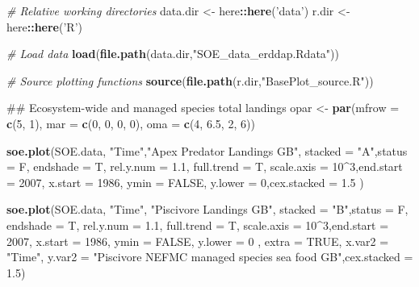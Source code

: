 \documentclass[]{article}
\newenvironment{Shaded}{\begin{snugshade}}{\end{snugshade}}
\newcommand{\KeywordTok}[1]{\textcolor[rgb]{0.13,0.29,0.53}{\textbf{#1}}}
\newcommand{\DataTypeTok}[1]{\textcolor[rgb]{0.13,0.29,0.53}{#1}}
\newcommand{\DecValTok}[1]{\textcolor[rgb]{0.00,0.00,0.81}{#1}}
\newcommand{\FloatTok}[1]{\textcolor[rgb]{0.00,0.00,0.81}{#1}}
\newcommand{\StringTok}[1]{\textcolor[rgb]{0.31,0.60,0.02}{#1}}
\newcommand{\CommentTok}[1]{\textcolor[rgb]{0.56,0.35,0.01}{\textit{#1}}}
\newcommand{\OtherTok}[1]{\textcolor[rgb]{0.56,0.35,0.01}{#1}}
\newcommand{\OperatorTok}[1]{\textcolor[rgb]{0.81,0.36,0.00}{\textbf{#1}}}
\newcommand{\NormalTok}[1]{#1}
\begin{document}
\begin{Shaded}
\begin{Highlighting}[]
\CommentTok{# Relative working directories}
\NormalTok{data.dir  <-}\StringTok{ }\NormalTok{here}\OperatorTok{::}\KeywordTok{here}\NormalTok{(}\StringTok{'data'}\NormalTok{)}
\NormalTok{r.dir <-}\StringTok{ }\NormalTok{here}\OperatorTok{::}\KeywordTok{here}\NormalTok{(}\StringTok{'R'}\NormalTok{)}

\CommentTok{# Load data}
\KeywordTok{load}\NormalTok{(}\KeywordTok{file.path}\NormalTok{(data.dir,}\StringTok{"SOE_data_erddap.Rdata"}\NormalTok{))}

\CommentTok{# Source plotting functions}
\KeywordTok{source}\NormalTok{(}\KeywordTok{file.path}\NormalTok{(r.dir,}\StringTok{"BasePlot_source.R"}\NormalTok{))}

\NormalTok{## Ecosystem-wide and managed species total landings}
\NormalTok{opar <-}\StringTok{ }\KeywordTok{par}\NormalTok{(}\DataTypeTok{mfrow =} \KeywordTok{c}\NormalTok{(}\DecValTok{5}\NormalTok{, }\DecValTok{1}\NormalTok{), }\DataTypeTok{mar =} \KeywordTok{c}\NormalTok{(}\DecValTok{0}\NormalTok{, }\DecValTok{0}\NormalTok{, }\DecValTok{0}\NormalTok{, }\DecValTok{0}\NormalTok{), }\DataTypeTok{oma =} \KeywordTok{c}\NormalTok{(}\DecValTok{4}\NormalTok{, }\FloatTok{6.5}\NormalTok{, }\DecValTok{2}\NormalTok{, }\DecValTok{6}\NormalTok{))}

\KeywordTok{soe.plot}\NormalTok{(SOE.data, }\StringTok{"Time"}\NormalTok{,}\StringTok{"Apex Predator Landings GB"}\NormalTok{, }\DataTypeTok{stacked =} \StringTok{"A"}\NormalTok{,}\DataTypeTok{status =}\NormalTok{ F,}
         \DataTypeTok{endshade =}\NormalTok{ T, }\DataTypeTok{rel.y.num =} \FloatTok{1.1}\NormalTok{, }\DataTypeTok{full.trend =}\NormalTok{ T, }\DataTypeTok{scale.axis =} \DecValTok{10}\OperatorTok{^}\DecValTok{3}\NormalTok{,}\DataTypeTok{end.start =} \DecValTok{2007}\NormalTok{, }\DataTypeTok{x.start =} \DecValTok{1986}\NormalTok{,}
         \DataTypeTok{ymin =} \OtherTok{FALSE}\NormalTok{, }\DataTypeTok{y.lower =} \DecValTok{0}\NormalTok{,}\DataTypeTok{cex.stacked =} \FloatTok{1.5}\NormalTok{ )}

\KeywordTok{soe.plot}\NormalTok{(SOE.data, }\StringTok{"Time"}\NormalTok{, }\StringTok{"Piscivore Landings GB"}\NormalTok{, }\DataTypeTok{stacked =} \StringTok{"B"}\NormalTok{,}\DataTypeTok{status =}\NormalTok{ F,}
         \DataTypeTok{endshade =}\NormalTok{ T, }\DataTypeTok{rel.y.num =} \FloatTok{1.1}\NormalTok{, }\DataTypeTok{full.trend =}\NormalTok{ T, }\DataTypeTok{scale.axis =} \DecValTok{10}\OperatorTok{^}\DecValTok{3}\NormalTok{,}\DataTypeTok{end.start =} \DecValTok{2007}\NormalTok{, }\DataTypeTok{x.start =} \DecValTok{1986}\NormalTok{,}
         \DataTypeTok{ymin =} \OtherTok{FALSE}\NormalTok{, }\DataTypeTok{y.lower =} \DecValTok{0}\NormalTok{ , }\DataTypeTok{extra =} \OtherTok{TRUE}\NormalTok{, }\DataTypeTok{x.var2 =} \StringTok{"Time"}\NormalTok{, }
         \DataTypeTok{y.var2 =} \StringTok{"Piscivore NEFMC managed species sea food GB"}\NormalTok{,}\DataTypeTok{cex.stacked =} \FloatTok{1.5}\NormalTok{)}


\end{Highlighting}
\end{Shaded}
\end{document}
